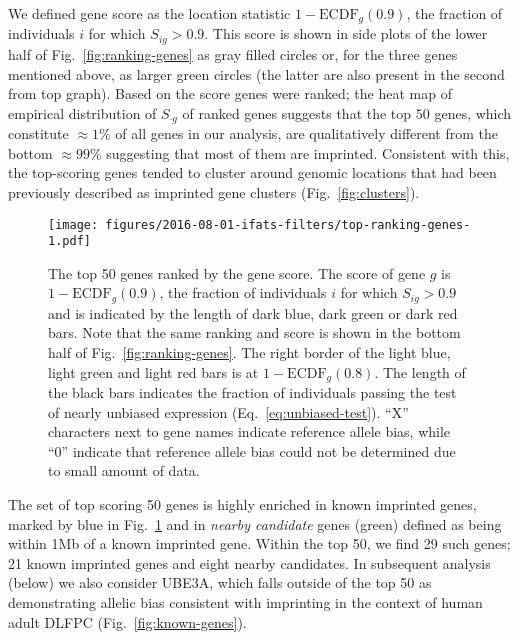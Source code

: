 \documentclass[12pt,letterpaper]{article}
\begin{document}
We defined gene score as
the location statistic \(1 - \mathrm{ECDF}_g(0.9)\), the fraction of
individuals \(i\) for which \(S_{ig}>0.9\).  This score is shown in side plots
of the lower half of Fig.~\ref{fig:ranking-genes} as gray filled circles or,
for the three genes mentioned above, as larger green circles (the latter are
also present in the second from top graph).  Based on the score genes were
ranked; the heat map of empirical distribution of \(S_{\cdot g}\) of ranked
genes suggests that the top \(50\) genes, which constitute \(\approx
1\%\) of all genes in our analysis, are qualitatively different from the
bottom \(\approx 99\%\) suggesting that most of them are imprinted.
Consistent with this, the top-scoring genes tended to cluster around genomic
locations that had been previously described as imprinted gene clusters
(Fig.~\ref{fig:clusters}).

\begin{figure}
\begin{center}
\texttt{[image: figures/2016-08-01-ifats-filters/top-ranking-genes-1.pdf]}
\caption{
The top 50 genes ranked by the gene score.  The score of gene \(g\) is \(1 -
\mathrm{ECDF}_g(0.9)\), the fraction of individuals \(i\) for which
\(S_{ig}>0.9\) and is indicated by the length of dark blue, dark green or dark
red bars.  Note that the same ranking and score is shown in the bottom half of
Fig.~\ref{fig:ranking-genes}.  The right border of the light blue, light green
and light red bars is at \(1 - \mathrm{ECDF}_g(0.8)\).  The length of the
black bars indicates the fraction of individuals passing the test of nearly
unbiased expression (Eq.~\ref{eq:unbiased-test}).  ``X'' characters next to
gene names indicate reference allele bias, while ``0'' indicate that
reference allele bias could not be determined due to small amount of data.
}
\label{fig:top-genes}
\end{center}
\end{figure}

The set of top scoring 50 genes is highly enriched in known imprinted genes,
marked by blue in Fig.~\ref{fig:top-genes} and in \emph{nearby candidate} genes
(green) defined as being within 1Mb of a known imprinted gene.
Within the top 50, we find 29 such genes; 21 known imprinted genes
and eight nearby candidates.  In subsequent analysis (below) we also consider UBE3A, which falls outside of
the top 50 as demonstrating allelic bias consistent with imprinting in the
context of human adult DLFPC (Fig.~\ref{fig:known-genes}).
\end{document}
